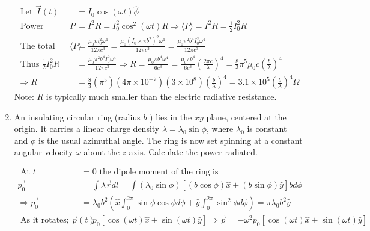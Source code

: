 \begin{enumerate}
	\begin{answer}
		\begin{align*}
		\text { Let } \vec{I}(t)&=I_{0} \cos (\omega t) \hat{\phi}\\
		\text { Power radiated } P&=I^{2} R=I_{0}^{2} \cos ^{2}(\omega t) R \Rightarrow\langle P\rangle=I^{2} R=\frac{1}{2} I_{0}^{2} R\\
		\text { The total power radiated is }\langle P\rangle&=\frac{\mu_{0} m_{0}^{2} \omega^{4}}{12 \pi c^{3}}=\frac{\mu_{0}\left(I_{0} \times \pi b^{2}\right)^{2} \omega^{4}}{12 \pi c^{3}}=\frac{\mu_{0} \pi^{2} b^{4} I_{0}^{2} \omega^{4}}{12 \pi c^{3}}\\
		\text { Thus } \frac{1}{2} I_{0}^{2} R&=\frac{\mu_{0} \pi^{2} b^{4} I_{0}^{2} \omega^{4}}{12 \pi c^{3}} \Rightarrow R=\frac{\mu_{0} \pi b^{4} \omega^{4}}{6 c^{3}}=\frac{\mu_{0} \pi b^{4}}{6 c^{3}}\left(\frac{2 \pi c}{\lambda}\right)^{4}=\frac{8}{3} \pi^{5} \mu_{0} c\left(\frac{b}{\lambda}\right)^{4}\\
		\Rightarrow R&=\frac{8}{3}\left(\pi^{5}\right)\left(4 \pi \times 10^{-7}\right)\left(3 \times 10^{8}\right)\left(\frac{b}{\lambda}\right)^{4}=3.1 \times 10^{5}\left(\frac{b}{\lambda}\right)^{4} \Omega
		\end{align*}
		Note: $R$ is typically much smaller than the electric radiative resistance.
	\end{answer}
	\item An insulating circular ring (radius $b$ ) lies in the $x y$ plane, centered at the origin. It carries a linear charge density $\lambda=\lambda_{0} \sin \phi$, where $\lambda_{0}$ is constant and $\phi$ is the usual azimuthal angle. The ring is now set spinning at a constant angular velocity $\omega$ about the $z$ axis. Calculate the power radiated.
	\begin{answer}
		\begin{align*}
		\text { At } t&=0 \text { the dipole moment of the ring is }\\
		\overrightarrow{p_{0}}&=\int \lambda \vec{r} d l=\int\left(\lambda_{0} \sin \phi\right)[(b \cos \phi) \hat{x}+(b \sin \phi) \hat{y}] b d \phi\\
		\Rightarrow \overrightarrow{p_{0}}&=\lambda_{0} b^{2}\left(\hat{x} \int_{0}^{2 \pi} \sin \phi \cos \phi d \phi+\hat{y} \int_{0}^{2 \pi} \sin ^{2} \phi d \phi\right)=\pi \lambda_{0} b^{2} \hat{y}\\
		\text { As it rotates; } \vec{p}(t)&=p_{0}[\cos (\omega t) \hat{x}+\sin (\omega t) \hat{y}] \Rightarrow \vec{p}=-\omega^{2} p_{0}[\cos (\omega t) \hat{x}+\sin (\omega t) \hat{y}]\\

\end{align*}
\end{answer}
\end{enumerate}
